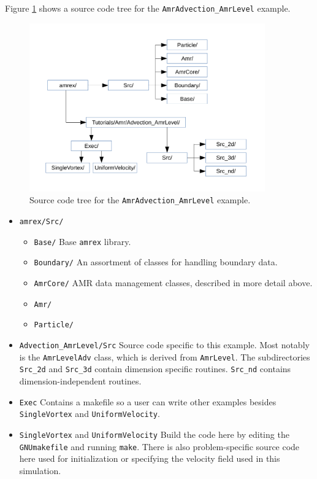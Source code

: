 Figure \ref{fig:AmrAdvection_AmrLevel_flowchart} shows a source
code tree for the {\tt AmrAdvection\_AmrLevel} example.
\begin{figure}[htb]
\begin{center}
\includegraphics[width=4in]{./AmrLevel/figs/flowchart.pdf}
\caption{\label{fig:AmrAdvection_AmrLevel_flowchart} Source code tree for the 
         {\tt AmrAdvection\_AmrLevel} example.}
\end{center}
\end{figure}
\begin{itemize}
\item {\tt amrex/Src/}
\begin{itemize}
\item {\tt Base/} Base {\tt amrex} library.
\item {\tt Boundary/} An assortment of classes for handling boundary data.
\item {\tt AmrCore/} AMR data management classes, described in more detail above.
\item {\tt Amr/}
\item {\tt Particle/}
\end{itemize}
\item {\tt Advection\_AmrLevel/Src} Source code specific to this example.  Most notably
is the {\tt AmrLevelAdv} class, which is derived from {\tt AmrLevel}.  The subdirectories {\tt Src\_2d}
and {\tt Src\_3d} contain dimension specific routines.  {\tt Src\_nd} contains dimension-independent routines.
\item {\tt Exec} Contains a makefile so a user can write other examples besides {\tt SingleVortex} and {\tt UniformVelocity}.
\item {\tt SingleVortex} and {\tt UniformVelocity}
Build the code here by editing the {\tt GNUmakefile} and running {\tt make}.  There
is also problem-specific source code here used for initialization or specifying the velocity field used in this
simulation.
\end{itemize}

